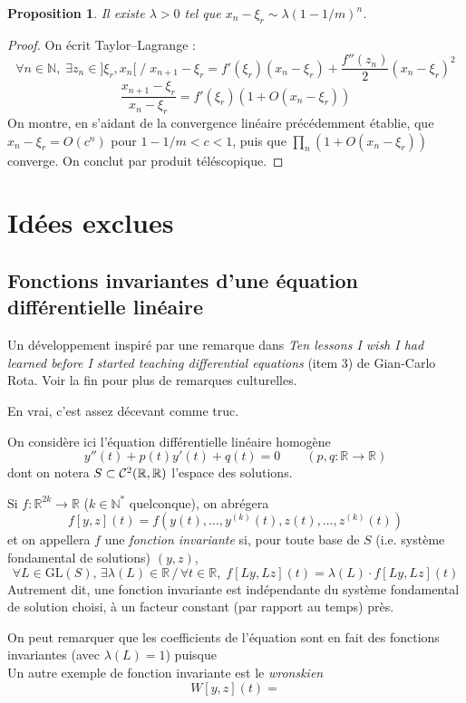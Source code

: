 \documentclass[a4paper, 11pt]{article}
\def\N{\mathbb{N}}
\def\R{\mathbb{R}}
\def\Cf{{\cal{C}}}
\def\GL{\mathrm{GL}}
\newtheorem*{proposition}{Proposition}
\begin{document}
\begin{proposition}
  Il existe $\lambda > 0$ tel que $x_n - \xi_r \sim \lambda (1 - 1/m)^n$.
\end{proposition}
\begin{proof}
  On écrit Taylor--Lagrange :
  \[ \forall n \in \N,\; \exists z_n \in ]\xi_r, x_n[ \;/\;
    x_{n+1} - \xi_r = f'(\xi_r)(x_n - \xi_r)
    + \frac{f''(z_n)}{2} (x_n - \xi_r)^2
  \]
  \[ \frac{x_{n+1} - \xi_r}{x_n - \xi_r} = f'(\xi_r)\left( 1 + O(x_n - \xi_r)
    \right)
  \]
  On montre, en s'aidant de la convergence linéaire précédemment établie, que
  $x_n - \xi_r = O(c^n)$ pour $1-1/m < c < 1$, puis que $\prod_n \left( 1 +
    O(x_n - \xi_r) \right)$ converge. On conclut par produit téléscopique.
\end{proof}

\newpage


\section{Idées exclues}

\subsection{Fonctions invariantes d'une équation différentielle linéaire}

Un développement inspiré par une remarque dans \emph{Ten lessons I wish I had
  learned before I started teaching differential equations} (item 3) de
Gian-Carlo Rota. Voir la fin pour plus de remarques culturelles.

En vrai, c'est assez décevant comme truc.

On considère ici l'équation différentielle linéaire
homogène
\[ y''(t) + p(t)y'(t) + q(t) = 0 \qquad (p, q : \R \to \R) \]
dont on notera $S \subset \Cf^2(\R, \R)$ l'espace des solutions.

Si $f : \R^{2k} \to \R$ ($k \in \N^*$ quelconque), on abrégera
\[ f[y,z](t) = f \left(y(t), \ldots, y^{(k)}(t), z(t), \ldots,
    z^{(k)}(t)\right) \]
et on appellera $f$ une \emph{fonction invariante} si, pour toute
base de $S$ (i.e. système fondamental de solutions) $(y, z)$,
\[
  \forall L \in \GL(S),\, \exists \lambda(L) \in \R \,/\, \forall t \in \R,\;
  f[Ly,Lz](t) = \lambda(L) \cdot f[Ly, Lz](t)
\]
Autrement dit, une fonction invariante est indépendante du système fondamental
de solution choisi, à un facteur constant (par rapport au temps) près.

On peut remarquer que les coefficients de l'équation sont en fait des fonctions
invariantes (avec $\lambda(L) = 1$) puisque
\[ \]
Un autre exemple de fonction invariante est le \emph{wronskien}
\[  W[y,z](t) =  \]
\end{document}
